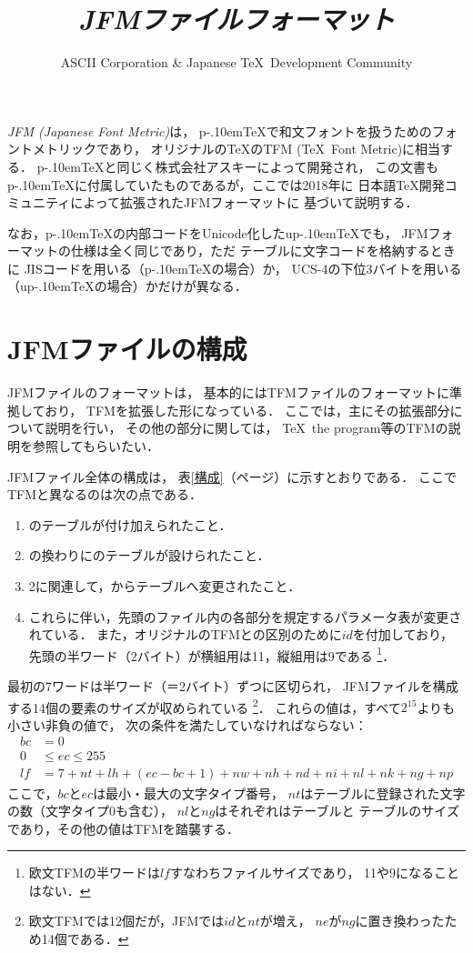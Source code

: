 \documentclass[a4paper,11pt,nomag]{jsarticle}
\title{\emph{JFMファイルフォーマット}}
\author{ASCII Corporation \& Japanese \TeX\ Development Community}
\def\size#1{\mathit{#1}}
\def\pTeX{p\kern-.10em\TeX}\def\upTeX{u\pTeX}
\begin{document}
\maketitle

\emph{JFM (Japanese Font Metric)}は，
\pTeX で和文フォントを扱うためのフォントメトリックであり，
オリジナルの\TeX のTFM (\TeX\ Font Metric)に相当する．
\pTeX と同じく株式会社アスキーによって開発され，
この文書も\pTeX に付属していたものであるが，ここでは2018年に
日本語\TeX 開発コミュニティによって拡張されたJFMフォーマットに
基づいて説明する．

なお，\pTeX の内部コードをUnicode化した\upTeX でも，
JFMフォーマットの仕様は全く同じであり，ただ
テーブルに文字コードを格納するときに
JISコードを用いる（\pTeX の場合）か，
UCS-4の下位3バイトを用いる（\upTeX の場合）かだけが異なる．

\section{JFMファイルの構成}

JFMファイルのフォーマットは，
基本的にはTFMファイルのフォーマットに準拠しており，
TFMを拡張した形になっている．
ここでは，主にその拡張部分について説明を行い，
その他の部分に関しては，
\TeX\ the program等のTFMの説明を参照してもらいたい．

JFMファイル全体の構成は，
表\ref{構成}（\pageref{構成}ページ）に示すとおりである．
ここでTFMと異なるのは次の点である．
\begin{enumerate}
\item {}のテーブルが付け加えられたこと．
\item {}の換わりにのテーブルが設けられたこと．
\item 2に関連して，からテーブルへ変更されたこと．
\item これらに伴い，先頭のファイル内の各部分を規定するパラメータ表が変更されている．
  また，オリジナルのTFMとの区別のために$\size{id}$を付加しており，
  先頭の半ワード（2バイト）が横組用は11，縦組用は9である
  \footnote{欧文TFMの半ワードは$\size{lf}$すなわちファイルサイズであり，
  11や9になることはない．}．
\end{enumerate}
最初の7ワードは半ワード（＝2バイト）ずつに区切られ，
JFMファイルを構成する14個の要素のサイズが収められている
\footnote{欧文TFMでは12個だが，JFMでは$\size{id}$と$\size{nt}$が増え，
$\size{ne}$が$\size{ng}$に置き換わったため14個である．}．
これらの値は，すべて$2^{15}$よりも小さい非負の値で，
次の条件を満たしていなければならない：
\begin{align*}
\size{bc} &= 0 \\
0 &\leq \size{ec} \leq 255 \\
\size{lf} &= 7+\size{nt}+\size{lh}+(\size{ec}-\size{bc}+1)+\size{nw}+\size{nh}
               +\size{nd}+\size{ni}+\size{nl}+\size{nk}+\size{ng}+\size{np}
\end{align*}
ここで，$\size{bc}$と$\size{ec}$は最小・最大の文字タイプ番号，
$\size{nt}$はテーブルに登録された文字の数（文字タイプ0も含む），
$\size{nl}$と$\size{ng}$はそれぞれはテーブルと
テーブルのサイズであり，その他の値はTFMを踏襲する．
\end{document}
